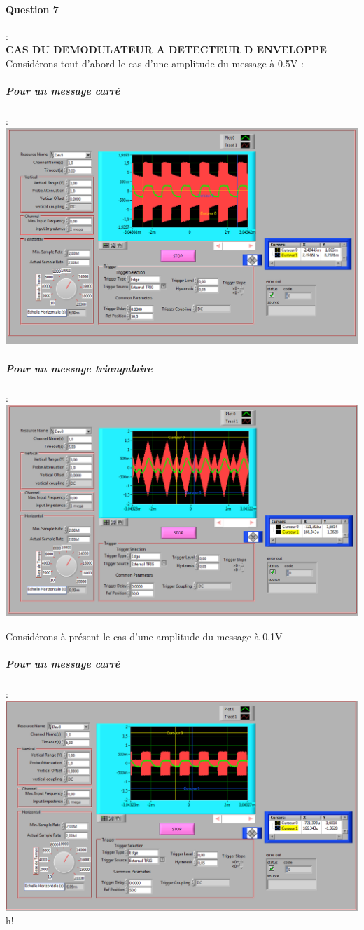 \documentclass[french]{article}
\begin{document}
\paragraph{Question 7} : \\

\textbf{CAS DU DEMODULATEUR A DETECTEUR D ENVELOPPE} \\
Considérons tout d'abord le cas d'une amplitude du message à 0.5V : 
\subparagraph{Pour un message carré} : \\
\includegraphics[width=\textwidth]{carre_enveloppe_05.png}

\subparagraph{Pour un message triangulaire} : \\
\includegraphics[width=\textwidth]{triangle_enveloppe_05.png}

Considérons à présent le cas d'une amplitude du message à 0.1V

\subparagraph{Pour un message carré} : \\
\includegraphics[width=\textwidth]{carre_enveloppe_01.png}{h!}
\end{document}
